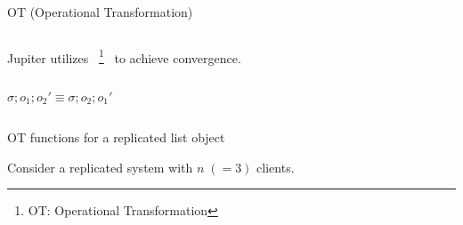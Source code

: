 \begin{frame}{}
  \centerline{OT (Operational Transformation)~}

  \begin{columns}
      \begin{center}
	
      \end{center}
      \begin{center}
	
      \end{center}
  \end{columns}
\end{frame}

\begin{frame}{}
  \begin{center}
    {\large Jupiter utilizes ~\footnote{OT: Operational Transformation}~ to achieve convergence.}
  \end{center}

  \begin{columns}[c]
      \[
	\sigma; o_1; o_2' \equiv \sigma; o_2; o_1'
      \]
  \end{columns}
\end{frame}

\begin{frame}{}
  \centerline{\large OT functions for a replicated list object~}

  \resizebox{\textwidth}{!}{
    \begin{minipage}{\textwidth}
      
    \end{minipage}
  }
\end{frame}

\begin{frame}{}
  \centerline{\large Consider a replicated system with $n \; (=3)$ clients.}

\end{frame}

